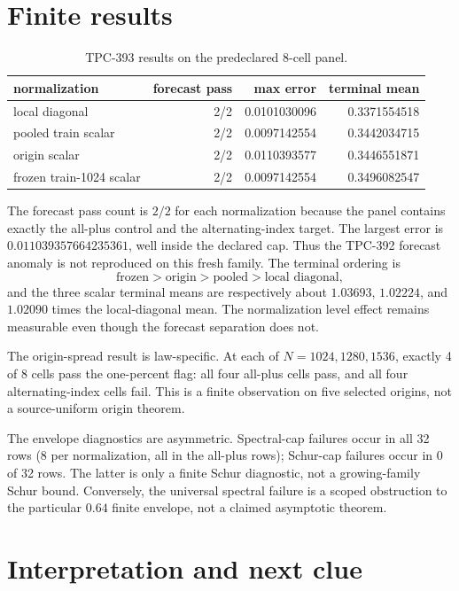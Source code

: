 \documentclass[10pt]{article}
\begin{document}
\section{Finite results}

\begin{table}[t]
\centering
\caption{TPC-393 results on the predeclared 8-cell panel.}
\label{tab:results}
\small
\begin{tabular}{@{}l r r r@{}}
\toprule
normalization & forecast pass & max error & terminal mean\\
\midrule
local diagonal & 2/2 & 0.0101030096 & 0.3371554518\\
pooled train scalar & 2/2 & 0.0097142554 & 0.3442034715\\
origin scalar & 2/2 & 0.0110393577 & 0.3446551871\\
frozen train-1024 scalar & 2/2 & 0.0097142554 & 0.3496082547\\
\bottomrule
\end{tabular}
\end{table}

The forecast pass count is $2/2$ for each normalization because the panel
contains exactly the all-plus control and the alternating-index target.  The
largest error is $0.011039357664235361$, well inside the declared cap.  Thus
the TPC-392 forecast anomaly is not reproduced on this fresh family.  The
terminal ordering is
\[
 \text{frozen} > \text{origin} > \text{pooled} > \text{local diagonal},
\]
and the three scalar terminal means are respectively about $1.03693$,
$1.02224$, and $1.02090$ times the local-diagonal mean.  The normalization
level effect remains measurable even though the forecast separation does not.

The origin-spread result is law-specific.  At each of $N=1024,1280,1536$,
exactly 4 of 8 cells pass the one-percent flag: all four all-plus cells pass,
and all four alternating-index cells fail.  This is a finite observation on
five selected origins, not a source-uniform origin theorem.

The envelope diagnostics are asymmetric.  Spectral-cap failures occur in
all 32 rows (8 per normalization, all in the all-plus rows); Schur-cap
failures occur in 0 of 32 rows.  The latter is only a finite Schur diagnostic,
not a growing-family Schur bound.  Conversely, the universal spectral failure
is a scoped obstruction to the particular $0.64$ finite envelope, not a
claimed asymptotic theorem.

\section{Interpretation and next clue}
\end{document}
